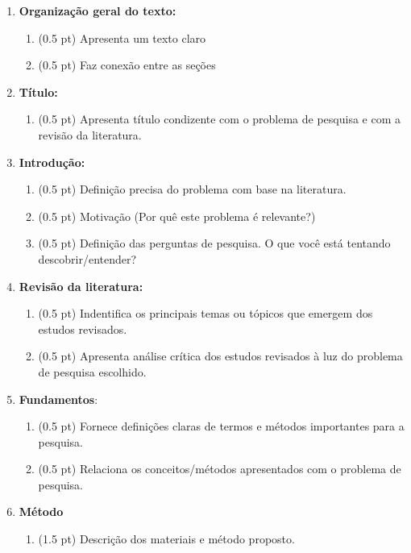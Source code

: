 \documentclass[12pt,a4paper, brazil]{article}
\begin{document}
\begin{enumerate}
    \item \textbf{Organização geral do texto:}
        \begin{enumerate}
            \item (0.5 pt) Apresenta um texto claro
            \item (0.5 pt) Faz conexão entre as seções
        \end{enumerate}
    \item \textbf{Título:} 
    \begin{enumerate}
        \item (0.5 pt) Apresenta título condizente com o problema de pesquisa e com a revisão da literatura.
    \end{enumerate}
    \item \textbf{Introdução:} 
        \begin{enumerate}
            \item (0.5 pt) Definição precisa do problema com base na literatura.
            \item (0.5 pt) Motivação (Por quê este problema é relevante?)
            \item (0.5 pt) Definição das perguntas de pesquisa. O que você está tentando descobrir/entender? 
        \end{enumerate}
    \item \textbf{Revisão da literatura:} 
        \begin{enumerate}
            \item (0.5 pt) Indentifica os principais temas ou tópicos que emergem dos estudos revisados.
            \item (0.5 pt) Apresenta análise crítica dos estudos revisados à luz do problema de pesquisa escolhido.
        \end{enumerate}
    \item \textbf{Fundamentos}:
        \begin{enumerate}
            \item (0.5 pt) Fornece definições claras de termos e métodos importantes para a pesquisa.
            \item (0.5 pt) Relaciona os conceitos/métodos apresentados com o problema de pesquisa.  
        \end{enumerate}
    \item \textbf{Método}
        \begin{enumerate}
            \item (1.5 pt) Descrição dos materiais e método proposto.

\end{enumerate}
\end{enumerate}
\end{document}

